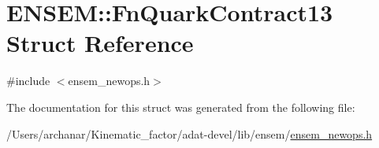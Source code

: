 \hypertarget{structENSEM_1_1FnQuarkContract13}{}\section{E\+N\+S\+EM\+:\+:Fn\+Quark\+Contract13 Struct Reference}
\label{structENSEM_1_1FnQuarkContract13}


{\ttfamily \#include $<$ensem\+\_\+newops.\+h$>$}



The documentation for this struct was generated from the following file\+:\begin{DoxyCompactItemize}
\item 
/\+Users/archanar/\+Kinematic\+\_\+factor/adat-\/devel/lib/ensem/\mbox{\hyperlink{adat-devel_2lib_2ensem_2ensem__newops_8h}{ensem\+\_\+newops.\+h}}\end{DoxyCompactItemize}
